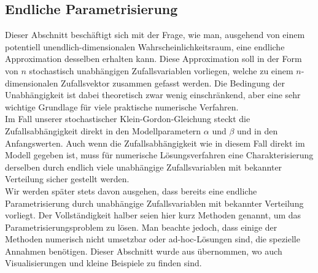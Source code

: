 \subsection{Endliche Parametrisierung}
\label{secfiniteparam}
Dieser Abschnitt beschäftigt sich mit der Frage, wie man, ausgehend von einem potentiell unendlich-dimensionalen Wahrscheinlichkeitsraum, eine endliche Approximation desselben erhalten kann. Diese Approximation soll in der Form von $n$ stochastisch unabhängigen Zufallsvariablen vorliegen, welche zu einem $n$-dimensionalen Zufallsvektor zusammen gefasst werden. Die Bedingung der Unabhängigkeit ist dabei theoretisch zwar wenig einschränkend, aber eine sehr wichtige Grundlage für viele praktische numerische Verfahren.\\
Im Fall unserer stochastischer Klein-Gordon-Gleichung steckt die Zufallsabhängigkeit direkt in den Modellparametern $\alpha$ und $\beta$ und in den Anfangswerten. Auch wenn die Zufallsabhängigkeit wie in diesem Fall direkt im Modell gegeben ist, muss für numerische Lösungsverfahren eine Charakterisierung derselben durch endlich viele unabhängige Zufallsvariablen mit bekannter Verteilung sicher gestellt werden.\\
Wir werden später stets davon ausgehen, dass bereits eine endliche Parametrisierung durch unabhängige Zufallsvariablen mit bekannter Verteilung vorliegt. Der Vollständigkeit halber seien hier kurz Methoden genannt, um das Parametrisierungsproblem zu lösen. Man beachte jedoch, dass einige der Methoden numerisch nicht umsetzbar oder ad-hoc-Lösungen sind, die spezielle Annahmen benötigen. Dieser Abschnitt wurde aus \autocite[Kapitel 4.1+4.2]{dongbinxiu2010} übernommen, wo auch Visualisierungen und kleine Beispiele zu finden sind.

